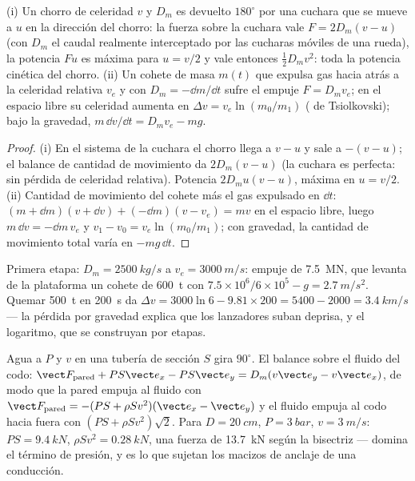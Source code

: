 \begin{proposition}\label{prop:b2:flow-balances:pelton}
(i) Un chorro de celeridad $v$ y  $D_m$ es devuelto
$180^\circ$ por una cuchara que se mueve a $u$ en la dirección del chorro:
la fuerza sobre la cuchara vale $F = 2D_m(v - u)$ (con $D_m$ el caudal
realmente interceptado por las cucharas móviles de una rueda), la potencia
$Fu$ es máxima para $u = v/2$ y vale entonces $\tfrac12D_mv^2$: toda la
potencia cinética del chorro. (ii) Un cohete de masa $m(t)$ que expulsa
gas hacia atrás a la celeridad relativa $v_e$ y con  $D_m = -\dd m/\dd t$ sufre el
empuje $F = D_mv_e$; en el espacio libre su celeridad aumenta en
$\Delta v = v_e\ln(m_0/m_1)$ ( de Tsiolkovski); bajo la gravedad,
$m\,\dd v/\dd t = D_mv_e - mg$.
\end{proposition}

\begin{proof}
(i) En el sistema de la cuchara el chorro llega a $v - u$ y sale a
$-(v - u)$; el balance de cantidad de movimiento da $2D_m(v - u)$ (la
cuchara es perfecta: sin pérdida de celeridad relativa). Potencia
$2D_mu(v - u)$, máxima en $u = v/2$. (ii) Cantidad de movimiento del cohete más el gas expulsado en $\dd t$: $(m + \dd m)
(v + \dd v) + (-\dd m)(v - v_e) = mv$ en el espacio libre, luego $m\,\dd v = -\dd m\,v_e$
y $v_1 - v_0 = v_e\ln(m_0/m_1)$; con gravedad, la cantidad de movimiento
total varía en $-mg\,\dd t$.
\end{proof}

\begin{example}[Un lanzador]\label{ex:b2:flow-balances:rocket}
Primera etapa: $D_m = \qty{2500}{kg/s}$ a $v_e = \qty{3000}{m/s}$: empuje de
\qty{7.5}{MN}, que levanta de la plataforma un cohete de \qty{600}{t} con $7.5 \times 10^6/6 \times 10^5 - g
= \qty{2.7}{m/s^2}$. Quemar \qty{500}{t} en \qty{200}{s} da
$\Delta v = 3000\ln6 - 9.81 \times 200 = 5400 - 2000 = \qty{3.4}{km/s}$ --- la
pérdida por gravedad explica que los lanzadores suban deprisa, y el
logaritmo, que se construyan por etapas.
\end{example}

\begin{example}\label{ex:b2:flow-balances:bend}
Agua a $P$ y $v$ en una tubería de sección $S$ gira $90^\circ$. El balance
sobre el fluido del codo: $\vect F_{\text{pared}} + PS\vect e_x - PS
\vect e_y = D_m(v\vect e_y - v\vect e_x)$, de modo que la pared empuja al fluido con
$\vect F_{\text{pared}} = -(PS + \rho Sv^2)(\vect e_x - \vect e_y)$ y el fluido
empuja al codo hacia fuera con $(PS + \rho Sv^2)\sqrt2$. Para $D = \qty{20}{cm}$,
$P = \qty{3}{bar}$, $v = \qty{3}{m/s}$: $PS = \qty{9.4}{kN}$, $\rho Sv^2 = \qty{0.28}{kN}$,
una fuerza de \qty{13.7}{kN} según la bisectriz --- domina el término de
presión, y es lo que sujetan los macizos de anclaje de una conducción.
\end{example}

